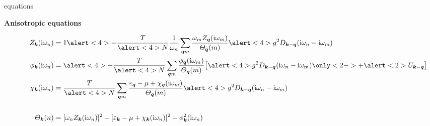 \documentclass[10pt]{beamer}
\begin{document}
    \begin{frame}[label=Eliashberg1]{ equations}
        \begin{center} \bf
            Anisotropic equations
        \end{center}
        \begin{align*}
            Z_{\vec k}(\I \omega_n) &= 1 \alert<4> - \frac T {\alert<4> N}
            \frac 1 {\omega_n} \sum_{\vec q m} \frac
                {\omega_m Z_{\vec q}(\I \omega_m)}
                {\Theta_{\vec q}(m)}
            \alert<4>{g^2 D_{\vec k - \vec q}(\I \omega_n - \I \omega_m)}
            \\
            \phi_{\vec k}(\I \omega_n) &= \alert<4> -\frac T {\alert<4> N}
            \sum_{\vec q m} \frac
                {\phi_{\vec q}(\I \omega_m)}
                {\Theta_{\vec q}(m)}
            \big[ \alert<4>{g^2 D_{\vec k - \vec q}(\I \omega_n - \I \omega_m)
            \only<2->{+ \alert<2>{U_{\vec k - \vec q}}}} \big]
            \\
            \chi_{\vec k}(\I \omega_n) &= \frac T {\alert<4> N}
            \sum_{\vec q m} \frac
                {\epsilon_{\vec q} - \mu + \chi_{\vec q}(\I \omega_m)}
                {\Theta_{\vec q}(m)}
            \alert<4>{g^2 D_{\vec k - \vec q}(\I \omega_n - \I \omega_m)}
            \\
            \hspace{2cm} & \hspace{8cm}
            \\
            \Theta_{\vec k}(n) &= [\omega_n Z_{\vec k}(\I \omega_n)]^2
            + [\epsilon_{\vec k} - \mu + \chi_{\vec k}(\I \omega_n)]^2
            + \phi^2_{\vec k}(\I \omega_n)
        \end{align*}
    \end{frame}
\end{document}
